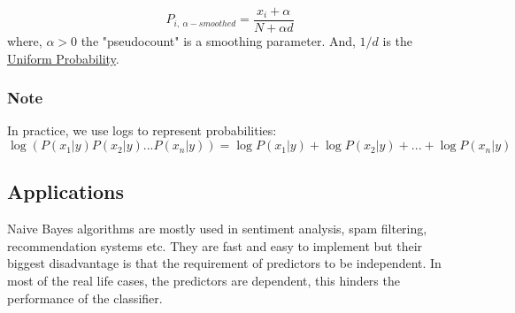 \documentclass[12pt, A4]{report}
\begin{document}
	\begin{equation}
		P_{i,\ \alpha-smoothed} = \frac{x_i+\alpha}{N+\alpha d}
	\end{equation}
	where, $\alpha > 0$ the "pseudocount" is a smoothing parameter. And, $1/d$ is the \href{https://en.wikipedia.org/wiki/Discrete_uniform_distribution}{Uniform Probability}.

	\subsubsection*{Note}
	In practice, we use logs to represent probabilities:
	\begin{equation}
		\log{(P(x_1|y)P(x_2|y)...P(x_n|y))} = \log{P(x_1|y)} + \log{P(x_2|y)} +...+ \log{P(x_n|y)}
	\end{equation}


\subsection*{Applications}
	Naive Bayes algorithms are mostly used in sentiment analysis, spam filtering, recommendation systems etc. They are fast and easy to implement but their biggest disadvantage is that the requirement of predictors to be independent. In most of the real life cases, the predictors are dependent, this hinders the performance of the classifier.
\end{document}
